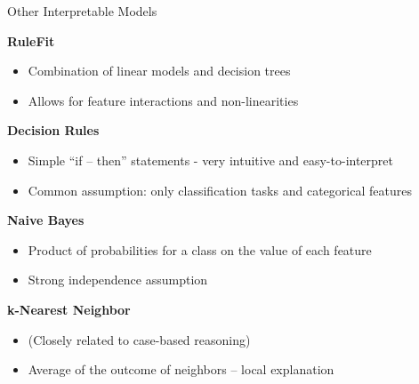 \documentclass[11pt,compress,t,notes=noshow, aspectratio=169, xcolor=table]{beamer}
\begin{document}
\begin{frame}[c]{Other Interpretable Models}

\textbf{RuleFit} 
\begin{itemize}
    \item Combination of linear models and decision trees 
    \item Allows for feature interactions and non-linearities
\end{itemize}

\textbf{Decision Rules} 
\begin{itemize}
    \item Simple ``if -- then'' statements - very intuitive and easy-to-interpret
    \item Common assumption: only classification tasks and categorical features
\end{itemize}

\textbf{Naive Bayes}
\begin{itemize}
    \item Product of probabilities for a class on the value of each feature
    \item Strong independence assumption
\end{itemize}


\textbf{k-Nearest Neighbor}
\begin{itemize}
    \item (Closely related to case-based reasoning)
    \item Average of the outcome of neighbors -- local explanation
\end{itemize}

\end{frame}


\endlecture
\end{document}
